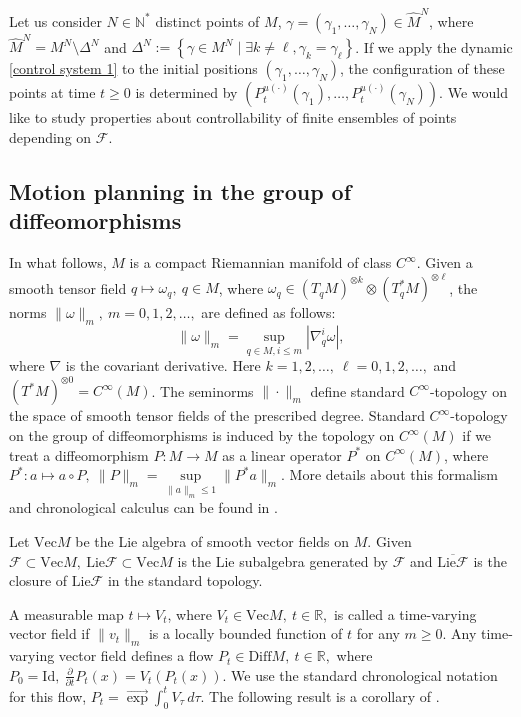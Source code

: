 \documentclass[10pt]{article}
\newcommand{\p}{\partial}
\newcommand{\R}{{\mathbb R}}
\newcommand{\N}{{\mathbb N}}
\newcommand{\F}{\mathcal F}
\newcommand{\Id}{\text{Id}}
\newcommand{\E}
{\overrightarrow{\exp}\int}
\begin{document}
Let us consider $N \in \N^*$ distinct points of $M$, $\gamma=(\gamma_1,\dots,\gamma_N)\in \hat{M}^N$, where $\hat{M}^N=M^N\setminus \Delta^N$ and $\Delta^N:=\left\{\gamma \in M^N \mid \exists k \neq \ell, \gamma_k=\gamma_\ell \right\}$. If we apply the dynamic \eqref{control system 1} to the initial positions $(\gamma_1, \dots, \gamma_N)$, the configuration of these points at time $t \geq 0$ is determined by $(P_t^{u(\cdot)}(\gamma_1),\dots,P_t^{u(\cdot)}(\gamma_N))$. We would like to study properties about controllability of finite ensembles of points depending on $\F$.


\subsection{Motion planning in the group of diffeomorphisms}

In what follows, $M$ is a compact Riemannian manifold of class $C^{\infty}$. Given a smooth tensor field $q\mapsto\omega_q,\ q\in M$,
where $\omega_q\in(T_qM)^{\otimes k}\otimes(T^*_qM)^{\otimes \ell}$, the norms $\|\omega\|_m,\ m=0,1,2,\ldots,$ are defined as follows:
$$
\|\omega\|_m=\sup\limits_{q\in M,i\le m}|\nabla^i_q\omega|,
$$
where $\nabla$ is the covariant derivative. Here $k=1,2,\ldots,\ \ell=0,1,2,\ldots,$ and $(T^*M)^{\otimes 0}=C^{\infty}(M)$. The seminorms $\|\cdot\|_m$
define standard $C^\infty$-topology on the space of smooth tensor fields of the prescribed degree. Standard $C^\infty$-topology on the group of 
diffeomorphisms is induced by the topology on $C^\infty(M)$ if we treat a diffeomorphism $P:M\to M$ as a linear operator $P^*$ on 
$C^\infty(M)$, where $P^*:a\mapsto a\circ P, \ \|P\|_m=\sup\limits_{\|a\|_m\le 1}\|P^*a\|_m$. More details about this formalism and chronological calculus can be found in \cite[Chap.~6]{AgBaBo}. 

Let $\mathrm{Vec}M$ be the Lie algebra of smooth vector fields on $M$. Given $\mathcal F\subset\mathrm{Vec}M,\ 
\mathrm{Lie}\mathcal F\subset\mathrm{Vec}M$ is the Lie subalgebra generated by $\mathcal F$ and $\overline{\mathrm{Lie}\mathcal F}$ is the closure
of $\mathrm{Lie}\mathcal F$ in the standard topology.

A measurable map $t\mapsto V_t$, where $V_t\in\mathrm{Vec}M,\ t\in\R,$ is called a time-varying vector field if $\|v_t\|_m$ is a locally bounded function
of $t$ for any $m\ge 0$. Any time-varying vector field defines a flow $P_t\in\mathrm{Diff}M,\ t\in\R,$ where $P_0=\Id,\ 
\frac{\p}{\p t}P_t(x)=V_t(P_t(x)).$ We use the standard chronological notation for this flow, $P_t=\E_0^tV_\tau\,d\tau$.
The following result is a corollary of \cite[Th.~3]{AgSa20}.
\end{document}
